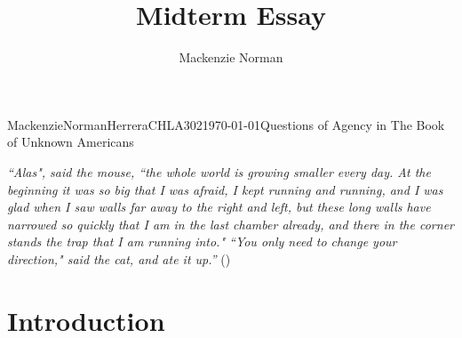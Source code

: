 \documentclass{article}
\title{Midterm Essay}
\author{Mackenzie Norman}
\begin{document}
\begin{mla}{Mackenzie}{Norman}{Herrera}{CHLA302}{\today}{Questions of Agency in The Book of Unknown Americans}

\noindent\textit{``Alas", said the mouse, ``the whole world is growing smaller every day. At the beginning it was so big that I was afraid, I kept running and running, and I was glad when I saw walls far away to the right and left, but these long walls have narrowed so quickly that I am in the last chamber already, and there in the corner stands the trap that I am running into." \linebreak \linebreak ``You only need to change your direction," said the cat, and ate it up.''} (\cite{eine-fable})

\section*{Introduction}

\end{mla}
\end{document}
